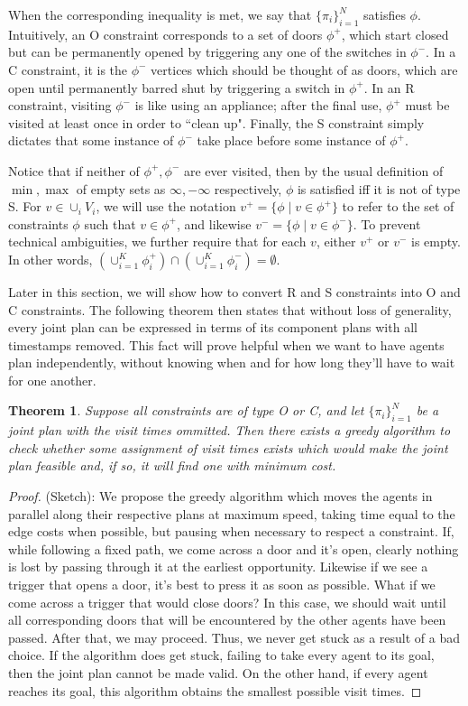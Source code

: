 \documentclass[letterpaper]{article}
\newtheorem{thm}{Theorem}
\begin{document}
When the corresponding inequality is met, we say that $\{\pi_i\}_{i=1}^N$ satisfies $\phi$. Intuitively, an O constraint corresponds to a set of doors $\phi^+$, which start closed but can be permanently opened by triggering any one of the switches in $\phi^-$. In a C constraint, it is the $\phi^-$ vertices which should be thought of as doors, which are open until permanently barred shut by triggering a switch in $\phi^+$. In an R constraint, visiting $\phi^-$ is like using an appliance; after the final use, $\phi^+$ must be visited at least once in order to ``clean up". Finally, the S constraint simply dictates that some instance of $\phi^-$ take place before some instance of $\phi^+$.

Notice that if neither of $\phi^+,\phi^-$ are ever visited, then by the usual definition of $\min,\max$ of empty sets as $\infty, -\infty$ respectively, $\phi$ is satisfied iff it is not of type S. For $v\in \cup_i V_i$, we will use the notation $v^+ = \{\phi \mid v\in\phi^+\}$ to refer to the set of constraints $\phi$ such that $v\in\phi^+$, and likewise $v^- = \{\phi \mid v\in\phi^-\}$. To prevent technical ambiguities, we further require that for each $v$, either $v^+$ or $v^-$ is empty. In other words, $(\cup_{i=1}^K \phi_i^+) \cap (\cup_{i=1}^K \phi_i^-) = \emptyset$.

Later in this section, we will show how to convert R and S constraints into O and C constraints. The following theorem then states that without loss of generality, every joint plan can be expressed in terms of its component plans with all timestamps removed. This fact will prove helpful when we want to have agents plan independently, without knowing when and for how long they'll have to wait for one another.

\begin{thm}
Suppose all constraints are of type O or C, and let $\{\pi_i\}_{i=1}^N$ be a joint plan with the visit times ommitted. Then there exists a greedy algorithm to check whether some assignment of visit times exists which would make the joint plan feasible and, if so, it will find one with minimum cost.
\end{thm} 

\begin{proof}
(Sketch): We propose the greedy algorithm which moves the agents in parallel along their respective plans at maximum speed, taking time equal to the edge costs when possible, but pausing when necessary to respect a constraint. If, while following a fixed path, we come across a door and it's open, clearly nothing is lost by passing through it at the earliest opportunity. Likewise if we see a trigger that opens a door, it's best to press it as soon as possible. What if we come across a trigger that would close doors? In this case, we should wait until all corresponding doors that will be encountered by the other agents have been passed. After that, we may proceed. Thus, we never get stuck as a result of a bad choice. If the algorithm does get stuck, failing to take every agent to its goal, then the joint plan cannot be made valid. On the other hand, if every agent reaches its goal, this algorithm obtains the smallest possible visit times.
\end{proof}
\end{document}

